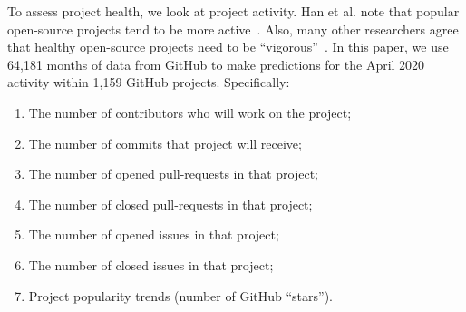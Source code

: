 \documentclass[smallextended]{svjour3}
\begin{document}

 

 To assess project health, we look at project activity.
  Han et al. note
 that popular open-source projects tend to be more active~\cite{han2019characterization}. Also, many other researchers agree that healthy open-source projects need to be ``vigorous''~\cite{wahyudin2007monitoring,jansen2014measuring,manikas2013reviewing,link2018assessing,wynn2007assessing,crowston2006assessing}.  
 In this paper, we use   64,181 months of data from  GitHub to make predictions for the   April 2020 activity within 1,159 GitHub projects. Specifically: 
 \begin{enumerate}
 \item The number of contributors who will work on the project; 
 \item The number of commits that project will receive;
 \item The number of opened pull-requests in that project;
 \item The number of closed pull-requests in that project;
 \item The number of opened issues in that project;
 \item The number of closed issues in that project;
 \item Project popularity trends (number of GitHub ``stars'').
 \end{enumerate}
\end{document}
